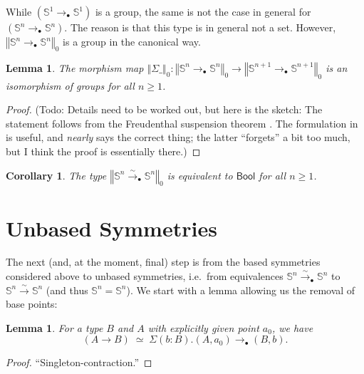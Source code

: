 \documentclass[11pt,a4paper,oneside,reqno]{amsart}
\newtheorem{lemma}[theorem]{Lemma}
\newtheorem{corollary}[theorem]{Corollary}
\theoremstyle{definition}
\theoremstyle{remark}
\newcommand{\sph}[1]{{\mathbb S}^{#1}}
\newcommand{\trunc}[2]{\mathopen{}\left\Vert #2\right\Vert_{#1}\mathclose{}}
\newcommand{\pointedm}{\rightarrow_\bullet}
\begin{document}
While $(\sph 1 \pointedm \sph 1)$ is a group, the same is not the case in general for $(\sph n \pointedm \sph n)$.
The reason is that this type is in general not a set.
However,
$\trunc 0 {\sph n \pointedm \sph n}$ is a group in the canonical way.

\begin{lemma} \label{lem:grp-iso}
 The morphism map $\trunc 0 {\Sigma \_} : \trunc 0 {\sph n \pointedm \sph n} \to \trunc 0 {\sph {n+1} \pointedm \sph {n+1}}$ is an isomorphism of groups for all $n \geq 1$.
\end{lemma}
\begin{proof}
 (Todo: Details need to be worked out, but here is the sketch: The statement follows from the Freudenthal suspension theorem \cite[Thm 8.6.4]{HoTT}. The formulation in \cite[Cor 8.6.14]{HoTT} is useful, and \cite[Thm 8.6.17]{HoTT} \emph{nearly} says the correct thing; the latter ``forgets'' a bit too much, but I think the proof is essentially there.)
\end{proof}


\begin{corollary} \label{cor:Sn-bool}
 The type
 $\trunc 0 {\sph n \xrightarrow{\sim}_\bullet \sph n}$
is equivalent to $\mathsf{Bool}$ for all $n \geq 1$.
\end{corollary}

\section{Unbased Symmetries}

The next (and, at the moment, final) step is from the based symmetries considered above to unbased symmetries, i.e.\ from equivalences $\sph n \xrightarrow{\sim}_\bullet \sph n$ to $\sph n \xrightarrow{\sim} \sph n$ (and thus $\sph n = \sph n$).
We start with a lemma allowing us the removal of base points:
\begin{lemma} \label{lem:rm-base-points}
 For a type $B$ and $A$ with explicitly given point $a_0$, we have
 \begin{equation}
  (A \to B) \; \simeq  \; \Sigma (b : B). (A,a_0) \to_\bullet (B,b).
 \end{equation}
\end{lemma}
\begin{proof}
 ``Singleton-contraction.''
\end{proof}
\end{document}
